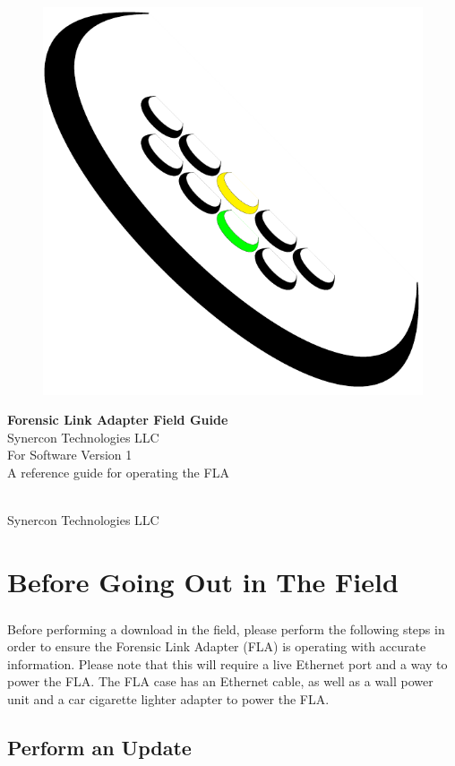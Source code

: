 \documentclass[11pt, oneside]{book}
\newcommand*{\titleGP}{\begingroup %
\centering %
\vspace*{\baselineskip} %
\begin{figure}[tbph]
\centering
\includegraphics[width=0.15\linewidth]{../media/logos/synercon_logo_v3_only}
\label{fig:logo}
\end{figure}
\vspace{4cm}
{\Huge \textbf{Forensic Link Adapter Field Guide}}\\[2\baselineskip] %
{\Huge Synercon Technologies LLC}\\[2\baselineskip]
{\Large For Software Version 1}\\
\vspace{2cm}
A reference guide for operating the FLA

\vfill %


\textcopyright {\scshape 2015} \\[0.3\baselineskip] %
Synercon Technologies LLC

\endgroup}
\begin{document}


\pagestyle{newstyle}




\thispagestyle{empty}
\titleGP %

\newpage
\frontmatter
\tableofcontents


\newpage
\mainmatter


\chapter{Before Going Out in The Field}
\paragraph{  }
Before performing a download in the field, please perform the following steps in order to ensure the Forensic Link Adapter (FLA) is operating with accurate information. Please note that this will require a live Ethernet port and a way to power the FLA. The FLA case has an Ethernet cable, as well as a wall power unit and a car cigarette lighter adapter to power the FLA.
\section{Perform an Update}
\end{document}
